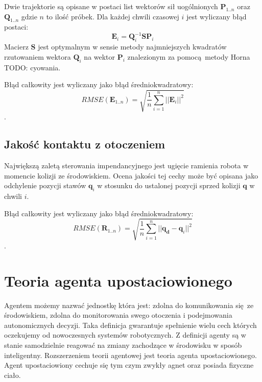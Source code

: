 Dwie trajektorie są opisane w postaci list wektorów sił uogólnionych $\boldsymbol{P}_{1..n}$ oraz $\boldsymbol{Q}_{1..n}$ gdzie $n$ to ilość próbek. Dla każdej chwili czasowej $i$ jest wyliczany błąd postaci:
\begin{equation}
\boldsymbol{E}_i = \boldsymbol{Q}_i^{-1}\boldsymbol{S}\boldsymbol{P}_i
\end{equation}
Macierz $\boldsymbol{S}$ jest optymalnym w sensie metody najmniejszych kwadratów rzutowaniem wektora $\boldsymbol{Q}_i$ na wektor $\boldsymbol{P}_i$ znalezionym za pomocą metody Horna TODO: cyowania. 

Błąd całkowity jest wyliczany jako błąd średniokwadratowy:
\begin{equation}
RMSE(\boldsymbol{E}_{1..n}) = \sqrt{\frac{1}{n}\sum_{i=1}^{n}||\boldsymbol{E}_i||^2}
\end{equation}.

\subsection{Jakość kontaktu z otoczeniem \label{chap:ocenakonaktu}}

Największą zaletą sterowania impendancyjnego jest ugięcie ramienia robota w momencie kolizji ze środowiskiem. Ocena jakości tej cechy może być opisana jako odchylenie pozycji stawów $\boldsymbol{q}_i$ w stosunku do ustalonej pozycji sprzed kolizji $\boldsymbol{q}$ w chwili $i$.


Błąd całkowity jest wyliczany jako błąd średniokwadratowy:
\begin{equation}
RMSE(\boldsymbol{R}_{1..n}) = \sqrt{\frac{1}{n}\sum_{i=1}^{n}||\boldsymbol{q_d}-\boldsymbol{q}_i||^2}
\end{equation}.

\section{Teoria agenta upostaciowionego}
Agentem możemy nazwać jednostkę która jest: zdolna do komunikowania się ze środowiskiem, zdolna do monitorowania swego otoczenia i podejmowania autonomicznych decyzji. Taka definicja gwarantuje spełnienie wielu cech których oczekujemy od nowoczesnych systemów robotycznych. Z definicji agenty są w stanie samodzielnie reagować na zmiany zachodzące w środowisku w sposób inteligentny. Rozszerzeniem teorii agentowej jest teoria agenta upostaciowionego. Agent upostaciowiony cechuje się tym czym zwykły agnet oraz posiada fizyczne ciało.


